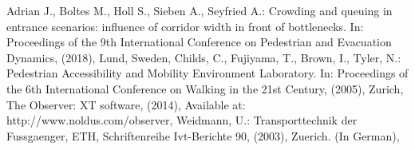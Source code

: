 \begin{thebibliography}{1}
    Adrian J., Boltes M., Holl S., Sieben A., Seyfried A.: Crowding and queuing in entrance scenarios: influence of corridor width in front of bottlenecks. In: Proceedings of the 9th International Conference on Pedestrian and Evacuation Dynamics, (2018), Lund, Sweden,
    Childs, C., Fujiyama, T., Brown, I., Tyler, N.: Pedestrian Accessibility and Mobility Environment Laboratory. In: Proceedings of the 6th International Conference on Walking in the 21st Century, (2005), Zurich,
    The Observer: XT software, (2014), Available at: http://www.noldus.com/observer,
    Weidmann, U.: Transporttechnik der Fussgaenger, ETH, Schriftenreihe Ivt-Berichte 90, (2003), Zuerich. (In German),
\end{thebibliography}